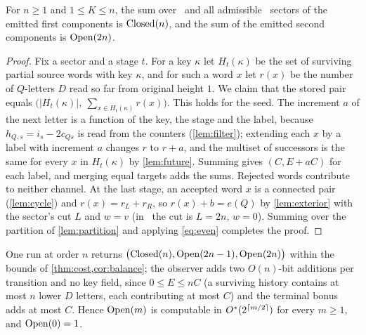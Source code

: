 \begin{theorem}
\label{thm:joint}
\leanok
{}
For $n\ge1$ and $1\le K\le n$, the sum over \LOW\ and all admissible \HIGH\
sectors of the emitted first components is $\operatorname{Closed}(n)$, and the sum of the
emitted second components is $\operatorname{Open}(2n)$.
\end{theorem}

\begin{proof}
\leanok
Fix a sector and a stage $t$. For a key $\kappa$ let $H_t(\kappa)$ be the set of
surviving partial source words with key $\kappa$, and for such a word $x$ let
$r(x)$ be the number of $Q$-letters $D$ read so far from original height $1$.
We claim that the stored pair equals
$\bigl(|H_t(\kappa)|,\ \sum_{x\in H_t(\kappa)}r(x)\bigr)$. This holds for the
seed. The increment $a$ of the next letter is a function of the key, the stage
and the label, because $h_{Q,s}=i_s-2c_{Qs}$ is read from the counters
(\cref{lem:filter}); extending each $x$ by a label with increment $a$ changes
$r$ to $r+a$, and the multiset of successors is the same for every $x$ in
$H_t(\kappa)$ by \cref{lem:future}. Summing gives $(C,E+aC)$ for each label,
and merging equal targets adds the sums. Rejected words contribute to neither
channel. At the last stage, an accepted word $x$ is a connected pair
(\cref{lem:cycle}) and $r(x)=r_L+r_R$, so $r(x)+b=e(Q)$ by
\cref{lem:exterior} with the sector's cut $L$ and $w=v$ (in \LOW\ the cut is
$L=2n$, $w=0$). Summing over the partition of \cref{lem:partition} and applying
\eqref{eq:even} completes the proof.
\end{proof}

\begin{corollary}
\label{cor:open}
\uses{thm:joint, thm:cost, cor:balance}
One run at order $n$ returns $\bigl(\operatorname{Closed}(n),\operatorname{Open}(2n-1),\operatorname{Open}(2n)\bigr)$
within the bounds of \cref{thm:cost,cor:balance}; the observer adds two
$O(n)$-bit additions per transition and no key field, since $0\le E\le nC$
(a surviving history contains at most $n$ lower $D$ letters, each
contributing at most $C$) and the terminal bonus adds at most $C$. Hence $\operatorname{Open}(m)$ is
computable in $O^{*}(2^{\lceil m/2\rceil})$ for every $m\ge1$, and
$\operatorname{Open}(0)=1$.
\end{corollary}


